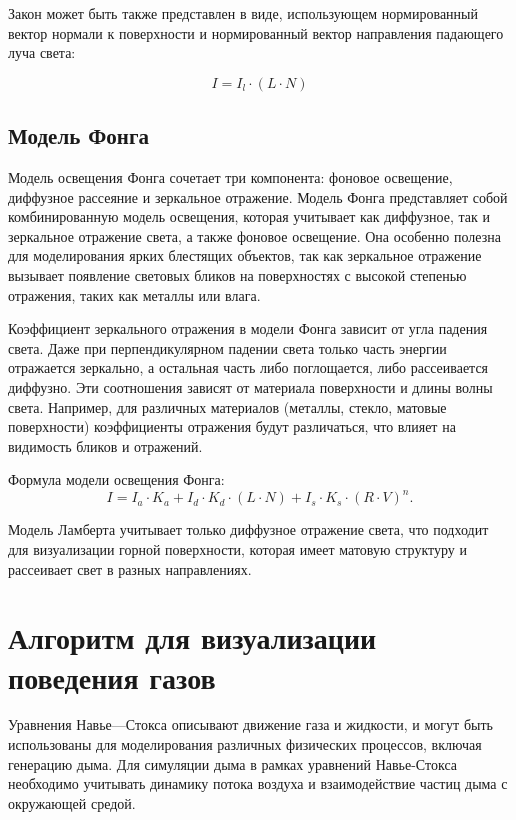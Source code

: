 Закон может быть также представлен в виде, использующем нормированный вектор нормали к поверхности и нормированный вектор направления падающего луча света:

\begin{equation}
	I = I_l \cdot (L \cdot N)
\end{equation}


\subsection{Модель Фонга}

Модель освещения Фонга сочетает три компонента: фоновое освещение, диффузное рассеяние и зеркальное отражение. Модель Фонга представляет собой комбинированную модель освещения, которая учитывает как диффузное, так и зеркальное отражение света, а также фоновое освещение. Она особенно полезна для моделирования ярких блестящих объектов, так как зеркальное отражение вызывает появление световых бликов на поверхностях с высокой степенью отражения, таких как металлы или влага.

Коэффициент зеркального отражения в модели Фонга зависит от угла падения света. Даже при перпендикулярном падении света только часть энергии отражается зеркально, а остальная часть либо поглощается, либо рассеивается диффузно. Эти соотношения зависят от материала поверхности и длины волны света. Например, для различных материалов (металлы, стекло, матовые поверхности) коэффициенты отражения будут различаться, что влияет на видимость бликов и отражений.

Формула модели освещения Фонга:
\begin{equation}
I = I_a \cdot K_a + I_d \cdot K_d \cdot (L \cdot N) + I_s \cdot K_s \cdot (R \cdot V)^n.
\end{equation}

Модель Ламберта учитывает только диффузное отражение света, что подходит для визуализации горной поверхности, которая имеет матовую структуру и рассеивает свет в разных направлениях.

\section{Алгоритм для визуализации поведения газов}
Уравнения Навье---Стокса описывают движение газа и жидкости, и могут быть использованы для моделирования различных физических процессов, включая генерацию дыма. Для симуляции дыма в рамках уравнений Навье-Стокса необходимо учитывать динамику потока воздуха и взаимодействие частиц дыма с окружающей средой.

